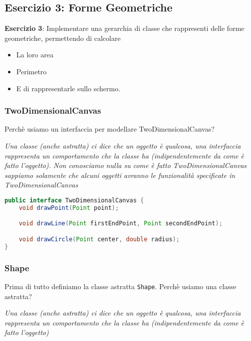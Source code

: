 \documentclass{article}
\begin{document}
\subsection{Esercizio 3: Forme Geometriche}
\begin{framed}
\textbf{Esercizio 3}: Implementare una gerarchia di classe che rappresenti delle forme geometriche, permettendo di calcolare
\begin{itemize}
\item  La loro area
\item Perimetro
\item E di rappresentarle sullo schermo.
\end{itemize}
\end{framed}

\subsubsection{TwoDimensionalCanvas}
Perch\`e usiamo un interfaccia per modellare TwoDimensionalCanvas?

\emph{Una classe (anche astratta) ci dice che un oggetto \`e qualcosa, una interfaccia rappresenta un comportamento che la classe ha (indipendentemente da come \`e fatto l’oggetto). Non conosciamo nulla su come \`e fatto TwoDimensionalCanvas sappiamo solamente che alcuni oggetti avranno le funzionalit\`a specificate in TwoDimensionalCanvas}

\begin{lstlisting}[language=Java,escapechar=|]
public interface TwoDimensionalCanvas {
	void drawPoint(Point point);

	void drawLine(Point firstEndPoint, Point secondEndPoint);

	void drawCircle(Point center, double radius);
}
\end{lstlisting}


\subsubsection{Shape}
Prima di tutto definiamo la classe astratta \texttt{Shape}. 
Perch\`e usiamo una classe astratta?

\emph{Una classe (anche astratta) ci dice che un oggetto \`e qualcosa, una interfaccia rappresenta un comportamento che la classe ha (indipendentemente da come \`e fatto l’oggetto)}
\end{document}
